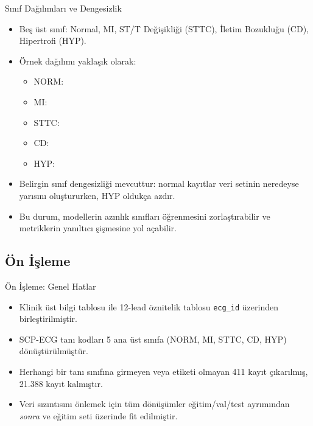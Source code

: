 \documentclass[aspectratio=169]{beamer}
\begin{document}
\begin{frame}{Sınıf Dağılımları ve Dengesizlik}
	\begin{itemize}
		\item Beş üst sınıf: Normal, MI, ST/T Değişikliği (STTC), İletim Bozukluğu (CD), Hipertrofi (HYP).
		\item Örnek dağılımı yaklaşık olarak:
		\begin{itemize}
			\item NORM: %
			\item MI: %
			\item STTC: %
			\item CD: %
			\item HYP: %
		\end{itemize}
		\item Belirgin sınıf dengesizliği mevcuttur: normal kayıtlar veri setinin neredeyse yarısını oluştururken, HYP oldukça azdır.
		\item Bu durum, modellerin azınlık sınıfları öğrenmesini zorlaştırabilir ve metriklerin yanıltıcı şişmesine yol açabilir.
	\end{itemize}
\end{frame}

\subsection{Ön İşleme}

\begin{frame}{Ön İşleme: Genel Hatlar}
	\begin{itemize}
		\item Klinik üst bilgi tablosu ile 12-lead öznitelik tablosu \texttt{ecg\_id} üzerinden birleştirilmiştir.
		\item SCP-ECG tanı kodları 5 ana üst sınıfa (NORM, MI, STTC, CD, HYP) dönüştürülmüştür.
		\item Herhangi bir tanı sınıfına girmeyen veya etiketi olmayan 411 kayıt çıkarılmış, 21.388 kayıt kalmıştır.
		\item Veri sızıntısını önlemek için tüm dönüşümler eğitim/val/test ayrımından \emph{sonra} ve eğitim seti üzerinde fit edilmiştir.
	\end{itemize}
\end{frame}
\end{document}
